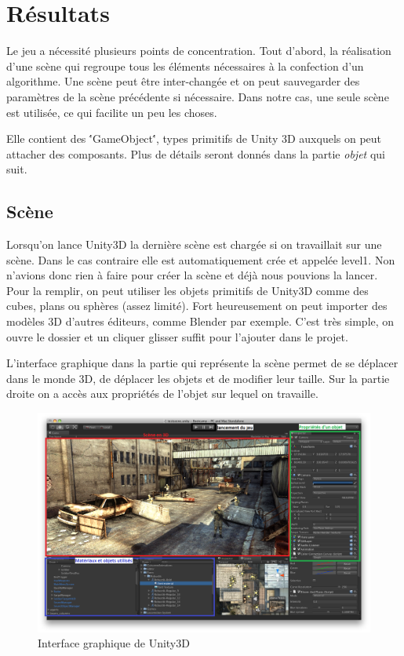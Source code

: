 \documentclass[a4paper,11pt]{myreport}
\begin{document}
\newpage

\chapter{Résultats}
\par Le jeu a nécessité plusieurs points de concentration. Tout d'abord, la réalisation d'une scène qui regroupe tous les éléments nécessaires à la confection d'un algorithme. Une scène peut être inter-changée et on peut sauvegarder des paramètres de la scène précédente si nécessaire. Dans notre cas, une seule scène est utilisée, ce qui facilite un peu les choses. 
\par Elle contient des \''GameObject\'', types primitifs de Unity 3D auxquels on peut attacher des composants. Plus de détails seront donnés dans la partie \textit{objet} qui suit.
	\section{Scène}
	\par Lorsqu'on lance Unity3D la dernière scène est chargée si on travaillait sur une scène. Dans le cas contraire elle est automatiquement crée et appelée level1. Non n'avions donc rien à faire pour créer la scène et déjà nous pouvions la lancer.
	Pour la remplir, on peut utiliser les objets primitifs de Unity3D comme des cubes, plans ou sphères (assez limité). Fort heureusement on peut importer des modèles 3D d'autres éditeurs, comme Blender par exemple. C'est très simple, on ouvre le dossier et un cliquer glisser suffit pour l'ajouter dans le projet.
	\par L'interface graphique dans la partie qui représente la scène permet de se déplacer dans le monde 3D, de déplacer les objets et de modifier leur taille.
	Sur la partie droite on a accès aux propriétés de l'objet sur lequel on travaille.
	\begin{figure}[h]
	\includegraphics[scale=0.45]{./images/unity-3D_interface.png}
	\caption{Interface graphique de Unity3D}
	\end{figure}
	
\end{document}
